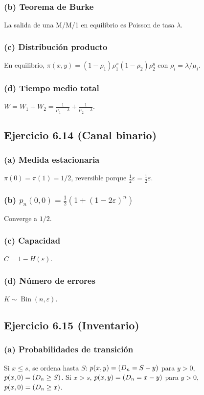 \documentclass[12pt]{article}
\let\P\relax
\newcommand{\P}{\mathbb{P}}
\newcommand{\1}{\mathbf{1}}
\newcommand{\Bin}{\operatorname{Bin}}
\begin{document}
\subsubsection*{(b) Teorema de Burke}
La salida de una M/M/1 en equilibrio es Poisson de tasa $\lambda$.

\subsubsection*{(c) Distribuci\'on producto}
En equilibrio, $\pi(x,y)=(1-\rho_1)\rho_1^x(1-\rho_2)\rho_2^y$ con $\rho_i=\lambda/\mu_i$.

\subsubsection*{(d) Tiempo medio total}
$W=W_1+W_2=\frac{1}{\mu_1-\lambda}+\frac{1}{\mu_2-\lambda}$.

\subsection{Ejercicio 6.14 (Canal binario)}

\subsubsection*{(a) Medida estacionaria}
$\pi(0)=\pi(1)=1/2$, reversible porque $\frac12\varepsilon=\frac12\varepsilon$.

\subsubsection*{(b) $p_n(0,0)=\frac12(1+(1-2\varepsilon)^n)$}
Converge a $1/2$.

\subsubsection*{(c) Capacidad}
$C=1-H(\varepsilon)$.

\subsubsection*{(d) N\'umero de errores}
$K\sim\Bin(n,\varepsilon)$.

\subsection{Ejercicio 6.15 (Inventario)}

\subsubsection*{(a) Probabilidades de transici\'on}
Si $x\le s$, se ordena hasta $S$: $p(x,y)=\P(D_n=S-y)$ para $y>0$, $p(x,0)=\P(D_n\ge S)$. Si $x>s$, $p(x,y)=\P(D_n=x-y)$ para $y>0$, $p(x,0)=\P(D_n\ge x)$.
\end{document}
